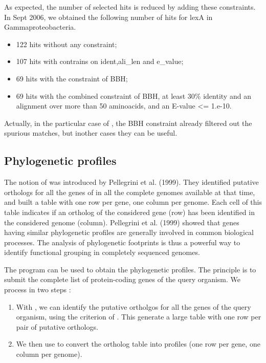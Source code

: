 As expected, the number of selected hits is reduced by adding these
constraints. In Sept 2006, we obtained the following number of hits
for lexA in Gammaproteobacteria.

\begin{itemize}
\item 122 hits without any constraint;
\item 107 hits with contrains on ident,ali\_len and e\_value;
\item 69 hits with the constraint of BBH;
\item 69 hits with the combined constraint of BBH, at least 30\%
  identity and an alignment over more than 50 aminoacids, and an
  E-value <= 1.e-10.
\end{itemize}

Actually, in the particular case of , the BBH constraint
already filtered out the spurious matches, but inother cases they can
be useful.

\subsection{Phylogenetic profiles}

The notion of  was introduced by
Pellegrini et al. (1999). They identified putative orthologs for all
the genes of  in all the complete genomes
available at that time, and built a table with one row per gene, one
column per genome. Each cell of this table indicates if an ortholog of
the considered gene (row) has been identified in the considered genome
(column). Pellegrini et al. (1999) showed that genes having similar
phylogenetic profiles are generally involved in common biological
processes. The analysis of phylogenetic footprints is thus a powerful
way to identify functional grouping in completely sequenced genomes.

The program  can be used to obtain the
phylogenetic profiles. The principle is to submit the complete list of
protein-coding genes of the query organism. We process in two steps : 

\begin{enumerate}

\item With , we can identify the putative
  ortholgos for all the genes of the query organism, using the
  criterion of . This generate a
  large table with one row per pair of putative orthologs.

\item We then use  to convert the ortholog
  table into profiles (one row per gene, one column per genome).

\end{enumerate}

